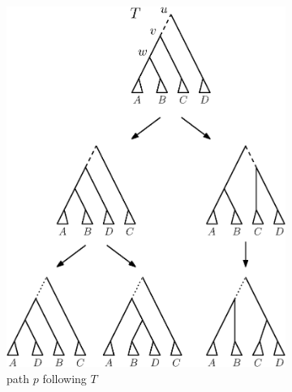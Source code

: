 \documentclass{amsart}
\begin{document}
\begin{enumerate}
    \begin{figure}[H]
        \begin{subfigure}[b]{.45\textwidth}
            \centering
            \includegraphics[width=0.9\linewidth]{thm_fp_nni2a.eps}
            \vspace{12pt}
            \caption{path $p$ following $T$}
                \label{fig:thm_fp_nni2a}
        \end{subfigure}
        \begin{subfigure}[b]{.45\textwidth}
            \centering

\end{subfigure}
\end{figure}
\end{enumerate}
\end{document}
